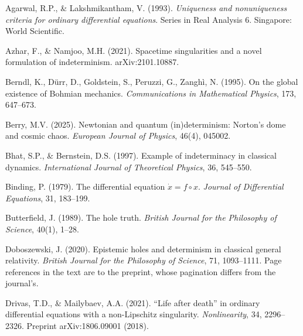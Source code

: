 \documentclass[12pt]{article}
\theoremstyle{plain}
\theoremstyle{definition}
\theoremstyle{remark}
\begin{document}
\begin{thebibliography}{}

Agarwal, R.P., \& Lakshmikantham, V. (1993). \emph{Uniqueness and nonuniqueness
criteria for ordinary differential equations}. Series in Real Analysis 6.
Singapore: World Scientific.

Azhar, F., \& Namjoo, M.H. (2021). Spacetime singularities and a novel
formulation of indeterminism. arXiv:2101.10887.

Berndl, K., D\"urr, D., Goldstein, S., Peruzzi, G., Zangh\`i, N. (1995). On the
global existence of Bohmian mechanics. \emph{Communications in Mathematical
Physics}, 173, 647--673.

Berry, M.V. (2025). Newtonian and quantum (in)determinism: Norton's dome and
cosmic chaos. \emph{European Journal of Physics}, 46(4), 045002.

Bhat, S.P., \& Bernstein, D.S. (1997). Example of indeterminacy in classical
dynamics. \emph{International Journal of Theoretical Physics}, 36, 545--550.

Binding, P. (1979). The differential equation $\dot x=f\circ x$. \emph{Journal
of Differential Equations}, 31, 183--199.

Butterfield, J. (1989). The hole truth. \emph{British Journal for the Philosophy
of Science}, 40(1), 1--28.

Doboszewski, J. (2020). Epistemic holes and determinism in classical general
relativity. \emph{British Journal for the Philosophy of Science}, 71,
1093--1111. Page references in the text are to the preprint, whose pagination
differs from the journal's.

Drivas, T.D., \& Mailybaev, A.A. (2021). ``Life after death'' in ordinary
differential equations with a non-Lipschitz singularity. \emph{Nonlinearity},
34, 2296--2326. Preprint arXiv:1806.09001 (2018).


\end{thebibliography}
\end{document}
